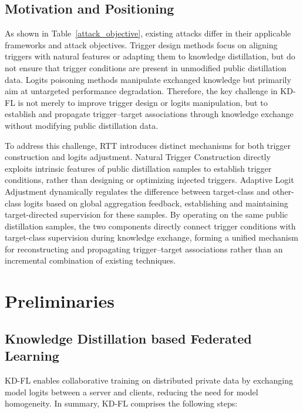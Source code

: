 \documentclass[lettersize,journal]{IEEEtran}
\newif\ifhighlight
\newcommand{\hltwo}[1]{%
    \ifhighlight{\color{reviewer2}#1}\else#1\fi
}
\begin{document}
\subsection{Motivation and Positioning}
\hltwo{
As shown in Table~\ref{attack_objective}, existing attacks differ in their applicable frameworks and attack objectives. Trigger design methods focus on aligning triggers with natural features or adapting them to knowledge distillation, but do not ensure that trigger conditions are present in unmodified public distillation data. Logits poisoning methods manipulate exchanged knowledge but primarily aim at untargeted performance degradation. Therefore, the key challenge in KD-FL is not merely to improve trigger design or logits manipulation, but to establish and propagate trigger--target associations through knowledge exchange without modifying public distillation data.

To address this challenge, RTT introduces distinct mechanisms for both trigger construction and logits adjustment. Natural Trigger Construction directly exploits intrinsic features of public distillation samples to establish trigger conditions, rather than designing or optimizing injected triggers. Adaptive Logit Adjustment dynamically regulates the difference between target-class and other-class logits based on global aggregation feedback, establishing and maintaining target-directed supervision for these samples. By operating on the same public distillation samples, the two components directly connect trigger conditions with target-class supervision during knowledge exchange, forming a unified mechanism for reconstructing and propagating trigger--target associations rather than an incremental combination of existing techniques.}

\section{Preliminaries}

\subsection{Knowledge Distillation based Federated Learning}

KD-FL enables collaborative training on distributed private data by exchanging model logits between a server and clients, reducing the need for model homogeneity. In summary, KD-FL comprises the following steps:
\end{document}
